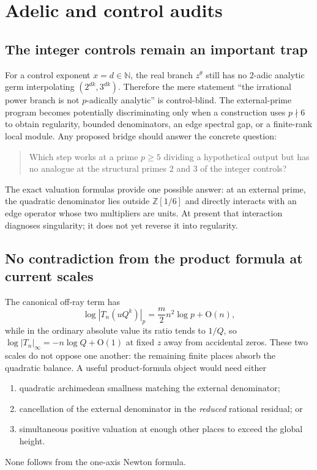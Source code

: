 \documentclass[11pt,oneside]{article}
\theoremstyle{definition}
\newcommand{\N}{\mathbb N}
\newcommand{\Z}{\mathbb Z}
\newcommand{\bigO}{\mathrm O}
\begin{document}
\section{Adelic and control audits}
\label{sec:audits}

\subsection{The integer controls remain an important trap}

For a control exponent $x=d\in\N$, the real branch $z^\theta$ still has no $2$-adic analytic
germ interpolating $(2^{dk},3^{dk})$.  Therefore the mere statement ``the irrational power
branch is not $p$-adically analytic'' is control-blind.  The external-prime program becomes
potentially discriminating only when a construction uses $p\nmid6$ to obtain regularity,
bounded denominators, an edge spectral gap, or a finite-rank local module.  Any proposed
bridge should answer the concrete question:

\begin{quote}
Which step works at a prime $p\ge5$ dividing a hypothetical output but has no analogue at the
structural primes $2$ and $3$ of the integer controls?
\end{quote}

The exact valuation formulas provide one possible answer: at an external prime, the
quadratic denominator lies outside $\Z[1/6]$ and directly interacts with an edge operator
whose two multipliers are units.  At present that interaction diagnoses singularity; it does
not yet reverse it into regularity.

\subsection{No contradiction from the product formula at current scales}

The canonical off-ray term has
\[
 \log|T_n(uQ^k)|_p
 =\frac m2n^2\log p+\bigO(n),
\]
while in the ordinary absolute value its ratio tends to $1/Q$, so
$\log|T_n|_\infty=-n\log Q+\bigO(1)$ at fixed $z$ away from accidental zeros.  These two
scales do not oppose one another: the remaining finite places absorb the quadratic balance.
A useful product-formula object would need either
\begin{enumerate}
\item quadratic archimedean smallness matching the external denominator;
\item cancellation of the external denominator in the \emph{reduced} rational residual; or
\item simultaneous positive valuation at enough other places to exceed the global height.
\end{enumerate}
None follows from the one-axis Newton formula.
\end{document}
